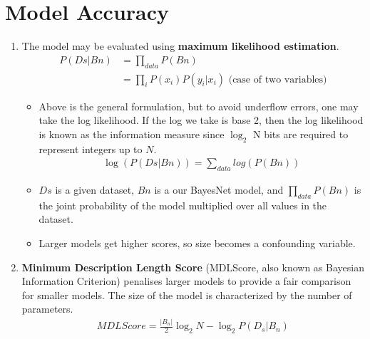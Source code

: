 \documentclass[12pt,twoside]{article}
\begin{document}
\section{Model Accuracy}
\begin{enumerate}
    \item The model may be evaluated using  \textbf{maximum likelihood estimation}.
		\begin{align*}
			P(Ds|Bn) 	&= \prod_{data} P(Bn)\\
							&= \prod_{i} P(x_i)P(y_i\vert x_i) \text{ (case of two variables)}
		\end{align*}		    
    
        \begin{itemize}
            \item Above is the general formulation, but to avoid underflow errors, one may take the log likelihood. If the log we take is base 2, then the log likelihood is known as the information measure since 
            			$\log_2$ N bits are required to represent integers up to $N$.
				\begin{align*}
					\log(P(Ds|Bn)) = \sum_{data} log(P(Bn))
				\end{align*}            

            \item $Ds$ is a given dataset, $Bn$ is a our BayesNet model, and $\prod_{data}P(Bn)$ is the joint probability of the model multiplied over all values in the dataset.
            \item Larger models get higher scores, so size becomes a confounding variable.
        \end{itemize}
        
    \item \textbf{Minimum Description Length Score} (MDLScore, also known as Bayesian Information Criterion) penalises larger models to provide a fair comparison for smaller models. The size of the model is characterized by the number of parameters.
			\begin{align*}
				MDLScore = \frac{\vert B_n \vert}{2}\log_2 N -\log_2 P(D_s\vert B_n)
			\end{align*}			    
    

\end{enumerate}
\end{document}
